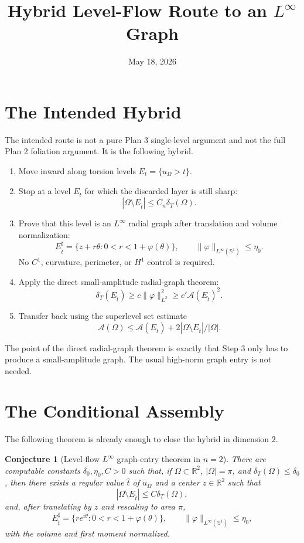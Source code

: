 \documentclass[11pt]{article}
\title{Hybrid Level-Flow Route to an \(L^\infty\) Graph}
\author{}
\date{May 18, 2026}
\newtheorem{conjecture}[theorem]{Conjecture}
\newcommand{\Om}{\Omega}
\newcommand{\R}{\mathbb R}
\newcommand{\Sph}{\mathbb S}
\newcommand{\cA}{\mathcal A}
\newcommand{\dT}{\delta_T}
\begin{document}
\maketitle

\section{The Intended Hybrid}

The intended route is not a pure Plan 3 single-level argument and not the
full Plan 2 foliation argument.  It is the following hybrid.

\begin{enumerate}
\item Move inward along torsion levels \(E_t=\{u_\Om>t\}\).
\item Stop at a level \(E_{\hat t}\) for which the discarded layer is still
sharp:
\[
   |\Om\setminus E_{\hat t}|\le C_n\dT(\Om).
\]
\item Prove that this level is an \(L^\infty\) radial graph after translation
and volume normalization:
\[
   E_{\hat t}^{\sharp}
      =\{z+r\theta:0<r<1+\varphi(\theta)\},
   \qquad
   \|\varphi\|_{L^\infty(\Sph^1)}\le\eta_0.
\]
No \(C^1\), curvature, perimeter, or \(H^1\) control is required.
\item Apply the direct small-amplitude radial-graph theorem:
\[
   \dT(E_{\hat t})\ge c\|\varphi\|_{L^2}^2
      \ge c'\cA(E_{\hat t})^2 .
\]
\item Transfer back using the superlevel set estimate
\[
   \cA(\Om)\le \cA(E_{\hat t})+
      2|\Om\setminus E_{\hat t}|/|\Om|.
\]
\end{enumerate}

The point of the direct radial-graph theorem is exactly that Step 3 only has
to produce a small-amplitude graph.  The usual high-norm graph entry is not
needed.

\section{The Conditional Assembly}

The following theorem is already enough to close the hybrid in dimension
\(2\).

\begin{conjecture}[Level-flow \(L^\infty\) graph-entry theorem in \(n=2\)]
\label{conj:linfty-entry}
There are computable constants \(\delta_0,\eta_0,C>0\) such that, if
\(\Om\subset\R^2\), \(|\Om|=\pi\), and \(\dT(\Om)\le\delta_0\), then there
exists a regular value \(\hat t\) of \(u_\Om\) and a center \(z\in\R^2\) such
that
\[
   |\Om\setminus E_{\hat t}|\le C\dT(\Om),
\]
and, after translating by \(z\) and rescaling to area \(\pi\),
\[
   E_{\hat t}^{\sharp}
      =\{r e^{i\theta}:0<r<1+\varphi(\theta)\},
   \qquad
   \|\varphi\|_{L^\infty(\Sph^1)}\le\eta_0,
\]
with the volume and first moment normalized.
\end{conjecture}
\end{document}
